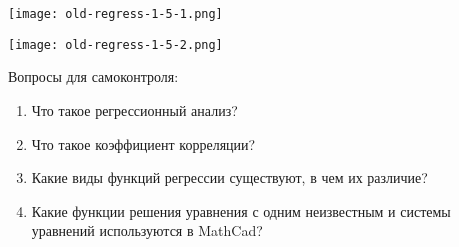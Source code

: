 \begin{center}
	\texttt{[image: old-regress-1-5-1.png]}
\end{center}

\begin{center}
	\texttt{[image: old-regress-1-5-2.png]}
\end{center}

Вопросы для самоконтроля:
\begin{enumerate}
\item Что такое регрессионный анализ?
\item Что такое коэффициент корреляции?
\item Какие виды функций регрессии существуют, в чем их различие?
\item Какие функции решения уравнения с одним неизвестным и системы уравнений используются в MathCad?
\end{enumerate}
